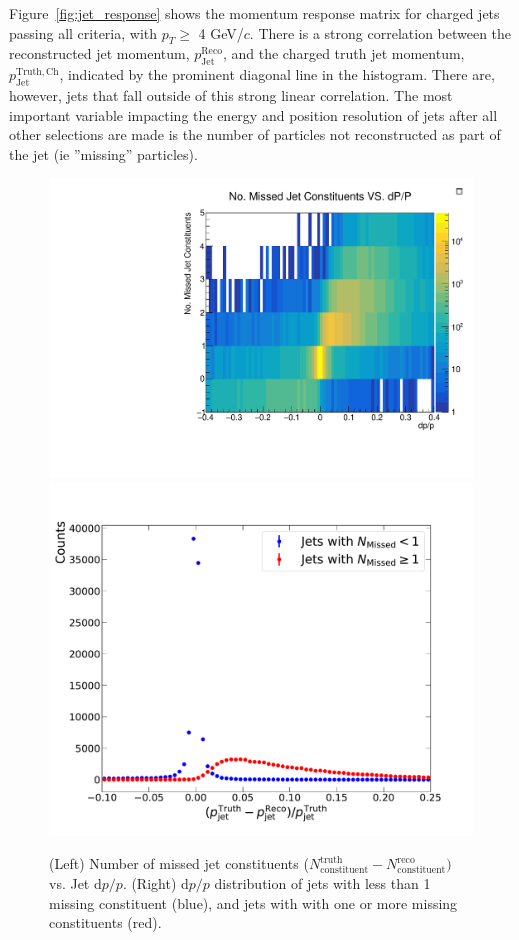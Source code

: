 Figure~\ref{fig:jet_response} shows the momentum response matrix for charged jets passing all criteria, with $p_T \ge$ 4 GeV/$c$. There is a strong correlation between the reconstructed jet momentum, $p_\mathrm{Jet}^\mathrm{Reco}$, and the charged truth jet momentum, $p_\mathrm{Jet}^\mathrm{Truth,Ch}$, indicated by the prominent diagonal line in the histogram. There are, however, jets that fall outside of this strong linear correlation. The most important variable impacting the energy and position resolution of jets after all other selections are made is the number of particles not reconstructed as part of the jet (ie ''missing'' particles).

\begin{figure}[htbp]
    \centering
    \includegraphics[width=0.42 \textwidth]{EIC_Jets/N_Miss_dPP}
    \includegraphics[width=0.42 \textwidth]{EIC_Jets/dPP_two_jets}
    \caption{(Left) Number of missed jet constituents ($N_\mathrm{constituent}^\mathrm{truth} - N_\mathrm{constituent}^\mathrm{reco})$ vs. Jet d$p/p$. (Right) d$p/p$ distribution of jets with less than 1 missing constituent (blue), and jets with with one or more missing constituents (red).}
    \label{fig:n_missed_vs_dpp}
\end{figure}

